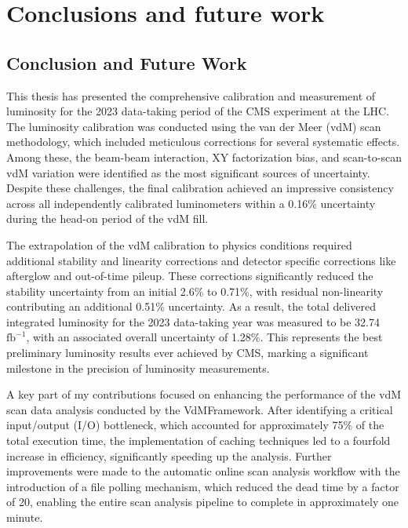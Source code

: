 \chapter{Conclusions and future work}

\section{Conclusion and Future Work}

This thesis has presented the comprehensive calibration and measurement of luminosity for the 2023 data-taking period of the CMS experiment at the LHC. The luminosity calibration was conducted using the van der Meer (vdM) scan methodology, which included meticulous corrections for several systematic effects. Among these, the beam-beam interaction, XY factorization bias, and scan-to-scan vdM variation were identified as the most significant sources of uncertainty. Despite these challenges, the final calibration achieved an impressive consistency across all independently calibrated luminometers within a 0.16\% uncertainty during the head-on period of the vdM fill. 

The extrapolation of the vdM calibration to physics conditions required additional stability and linearity corrections and detector specific corrections like afterglow and out-of-time pileup. These corrections significantly reduced the stability uncertainty from an initial 2.6\% to 0.71\%, with residual non-linearity contributing an additional 0.51\% uncertainty. As a result, the total delivered integrated luminosity for the 2023 data-taking year was measured to be 32.74 $\text{fb}^{-1}$, with an associated overall uncertainty of 1.28\%. This represents the best preliminary luminosity results ever achieved by CMS, marking a significant milestone in the precision of luminosity measurements.

A key part of my contributions focused on enhancing the performance of the vdM scan data analysis conducted by the VdMFramework. After identifying a critical input/output (I/O) bottleneck, which accounted for approximately 75\% of the total execution time, the implementation of caching techniques led to a fourfold increase in efficiency, significantly speeding up the analysis. Further improvements were made to the automatic online scan analysis workflow with the introduction of a file polling mechanism, which reduced the dead time by a factor of 20, enabling the entire scan analysis pipeline to complete in approximately one minute.

